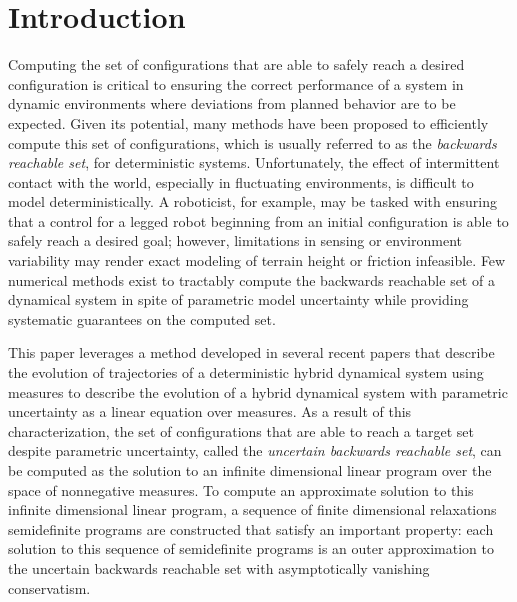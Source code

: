 \section{Introduction}
  
Computing the set of configurations that are able to safely reach a desired configuration is critical to ensuring the correct performance of a system in dynamic environments where deviations from planned behavior are to be expected.
Given its potential, many methods have been proposed to efficiently compute this set of configurations, which is usually referred to as the \emph{backwards reachable set}, for deterministic systems.
Unfortunately, the effect of intermittent contact with the world, especially in fluctuating environments, is difficult to model deterministically. 
A roboticist, for example, may be tasked with ensuring that a control for a legged robot beginning from an initial configuration is able to safely reach a desired goal; however, limitations in sensing or environment variability may render exact modeling of terrain height or friction infeasible.
Few numerical methods exist to tractably compute the backwards reachable set of a dynamical system in spite of parametric model uncertainty while providing systematic guarantees on the computed set. 

This paper leverages a method developed in several recent papers that describe the evolution of trajectories of a deterministic hybrid dynamical system using measures to describe the evolution of a hybrid dynamical system with parametric uncertainty as a linear equation over measures. 
As a result of this characterization, the set of configurations that are able to reach a target set despite parametric uncertainty, called the \emph{uncertain backwards reachable set}, can be computed as the solution to an infinite dimensional linear program over the space of nonnegative measures. 
To compute an approximate solution to this infinite dimensional linear program, a sequence of finite dimensional relaxations semidefinite programs are constructed that satisfy an important property:
each solution to this sequence of semidefinite programs is an outer approximation to the uncertain backwards reachable set with asymptotically vanishing conservatism.

